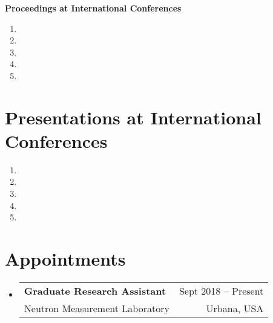 \documentclass[letterpaper,11pt]{article} %
\makeatletter
\newcommand{\CVSubheading}[4]{
  \vspace{-2pt}\item
    \begin{tabular*}{0.97\textwidth}[t]{l@{\extracolsep{\fill}}r}
      \textbf{#1} & #2 \\
      \small#3 & \small #4 \\
    \end{tabular*}\vspace{-7pt}
}
\newcommand{\CVSubHeadingListStart}{\begin{itemize}[leftmargin=0.5cm, label={}]}
\newcommand{\CVSubHeadingListEnd}{\end{itemize}}
\makeatother
\begin{document}
\hspace{1.5em}\textbf{Proceedings at International Conferences}
\begin{enumerate}
    \item {}
    \item {}
    \item {}
    \item {}
    \item {}
\end{enumerate}

\begin{comment}
Again the title should have already been enough, but if it is necessary to add
descriptions maintain the consistency from prior sections
\end{comment}
\section{Presentations at International Conferences}
    \begin{enumerate}
        \item {}
        \item {}
        \item {}
        \item {}
        \item {}
    \end{enumerate}
 
\begin{comment}
Section is here as it applied to my application for positions in academia. 
Remember to tailor the resume for to the position.
\end{comment}
\section{Appointments}
\CVSubHeadingListStart
    \CVSubheading
      {Graduate Research Assistant}{Sept 2018 – Present}
      {Neutron Measurement Laboratory}{Urbana, USA}
  \CVSubHeadingListEnd
\end{document}
